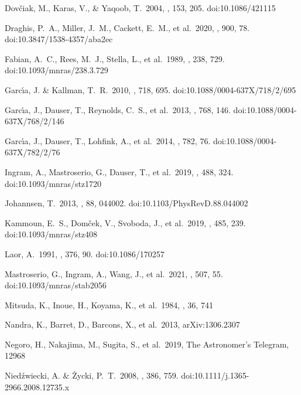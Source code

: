 \documentclass[twocolumn]{emulateapj}
\begin{document}
\begin{thebibliography}{99}
 Dov{\v{c}}iak, M., Karas, V., \& Yaqoob, T.\ 2004, \apjs, 153, 205. doi:10.1086/421115

 Draghis, P.~A., Miller, J.~M., Cackett, E.~M., et al.\ 2020, \apj, 900, 78. doi:10.3847/1538-4357/aba2ec

 Fabian, A.~C., Rees, M.~J., Stella, L., et al.\ 1989, \mnras, 238, 729. doi:10.1093/mnras/238.3.729

 Garc{\'\i}a, J. \& Kallman, T.~R.\ 2010, \apj, 718, 695. doi:10.1088/0004-637X/718/2/695

 Garc{\'\i}a, J., Dauser, T., Reynolds, C.~S., et al.\ 2013, \apj, 768, 146. doi:10.1088/0004-637X/768/2/146

 Garc{\'\i}a, J., Dauser, T., Lohfink, A., et al.\ 2014, \apj, 782, 76. doi:10.1088/0004-637X/782/2/76

 Ingram, A., Mastroserio, G., Dauser, T., et al.\ 2019, \mnras, 488, 324. doi:10.1093/mnras/stz1720

 Johannsen, T.\ 2013, \prd, 88, 044002. doi:10.1103/PhysRevD.88.044002

 Kammoun, E.~S., Dom{\v{c}}ek, V., Svoboda, J., et al.\ 2019, \mnras, 485, 239. doi:10.1093/mnras/stz408

 Laor, A.\ 1991, \apj, 376, 90. doi:10.1086/170257

 Mastroserio, G., Ingram, A., Wang, J., et al.\ 2021, \mnras, 507, 55. doi:10.1093/mnras/stab2056

 Mitsuda, K., Inoue, H., Koyama, K., et al.\ 1984, \pasj, 36, 741

 Nandra, K., Barret, D., Barcons, X., et al.\ 2013, arXiv:1306.2307

 Negoro, H., Nakajima, M., Sugita, S., et al.\ 2019, The Astronomer's Telegram, 12968

 Nied{\'z}wiecki, A. \& {\.Z}ycki, P.~T.\ 2008, \mnras, 386, 759. doi:10.1111/j.1365-2966.2008.12735.x


\end{thebibliography}
\end{document}
